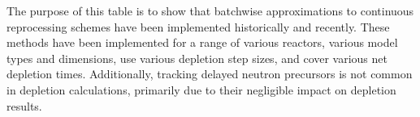 
The purpose of this table is to show that batchwise approximations to continuous reprocessing schemes have been implemented historically and recently. These methods have been implemented for a range of various reactors, various model types and dimensions, use various depletion step sizes, and cover various net depletion times. Additionally, tracking delayed neutron precursors is not common in depletion calculations, primarily due to their negligible impact on depletion results.


